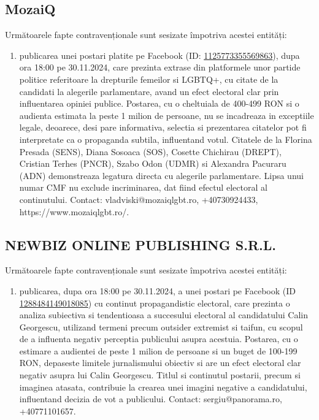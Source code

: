 \documentclass[a4paper,12pt]{article}
\begin{document}
\vspace{0.5cm}

\subsection{MozaiQ}
Următoarele fapte contravenționale sunt sesizate împotriva acestei entități:

\begin{enumerate}[leftmargin=*, label=\arabic*.)]
    \item publicarea unei postari platite pe Facebook (ID: \href{https://www.facebook.com/ads/library/?id=1125773355569863}{1125773355569863}), dupa ora 18:00 pe 30.11.2024, care prezinta extrase din platformele unor partide politice referitoare la drepturile femeilor si LGBTQ+, cu citate de la candidati la alegerile parlamentare, avand un efect electoral clar prin influentarea opiniei publice.  Postarea, cu o cheltuiala de 400-499 RON si o audienta estimata la peste 1 milion de persoane,  nu se incadreaza in exceptiile legale, deoarece, desi pare informativa, selectia si prezentarea citatelor pot fi interpretate ca o propaganda subtila, influentand votul.  Citatele de la Florina Presada (SENS), Diana Sosoaca (SOS), Cosette Chichirau (DREPT), Cristian Terhes (PNCR), Szabo Odon (UDMR) si Alexandra Pacuraru (ADN) demonstreaza legatura directa cu alegerile parlamentare.  Lipsa unui numar CMF nu exclude incriminarea, dat fiind efectul electoral al continutului.  Contact: vladviski@mozaiqlgbt.ro, +40730924433, https://www.mozaiqlgbt.ro/.
\end{enumerate}

\vspace{0.5cm}

\subsection{NEWBIZ ONLINE PUBLISHING S.R.L.}
Următoarele fapte contravenționale sunt sesizate împotriva acestei entități:

\begin{enumerate}[leftmargin=*, label=\arabic*.)]
    \item publicarea, dupa ora 18:00 pe 30.11.2024, a unei postari pe Facebook (ID \href{https://www.facebook.com/ads/library/?id=1288484149018085}{1288484149018085}) cu continut propagandistic electoral, care prezinta o analiza subiectiva si tendentioasa a succesului electoral al candidatului Calin Georgescu, utilizand termeni precum outsider extremist si taifun, cu scopul de a influenta negativ perceptia publicului asupra acestuia.  Postarea, cu o estimare a audientei de peste 1 milion de persoane si un buget de 100-199 RON, depaseste limitele jurnalismului obiectiv si are un efect electoral clar negativ asupra lui Calin Georgescu.  Titlul si continutul postarii, precum si imaginea atasata, contribuie la crearea unei imagini negative a candidatului, influentand decizia de vot a publicului.  Contact: sergiu@panorama.ro, +40771101657.
\end{enumerate}
\end{document}
